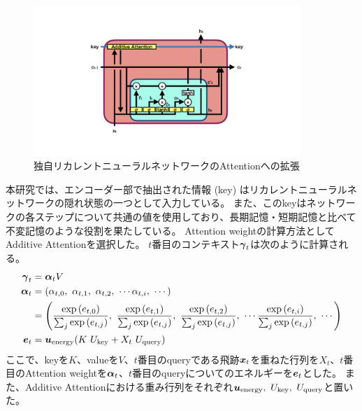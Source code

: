 \begin{figure}[htbp]
 \centering
 \includegraphics[trim = 100 100 100 150, width=0.9\textwidth, clip]{Figure/3Networks/3-4-1-5AttentionVLSTM.png}
 \caption{独自リカレントニューラルネットワークのAttentionへの拡張}
 \label{3-4-1-5AttentionVLSTM}
\end{figure}

本研究では、エンコーダー部で抽出された情報 (key) はリカレントニューラルネットワークの隠れ状態の一つとして入力している。
また、このkeyはネットワークの各ステップについて共通の値を使用しており、長期記憶・短期記憶と比べて不変記憶のような役割を果たしている。
Attention weightの計算方法としてAdditive Attentionを選択した。
$t$番目のコンテキスト${\mbox{\boldmath{$\gamma$}}}_{t}$は次のように計算される。
\begin{equation}
 \begin{split}
  {\mbox{\boldmath{$\gamma$}}}_{t} 
  &= {\mbox{\boldmath{$\alpha$}}}_{t} V\\
  {\mbox{\boldmath{$\alpha$}}}_{t}
  &= (\alpha_{t,0},\ \alpha_{t,1},\ \alpha_{t,2},\ \cdots \alpha_{t,i},\ \cdots) \\
  &= \left(\frac{\exp{({{e}}_{t,0})}}{\sum_j \exp{({{e}}_{t,j})}},\ \frac{\exp{({{e}}_{t,1})}}{\sum_j \exp{({{e}}_{t,j})}},\ \frac{\exp{({{e}}_{t,2})}}{\sum_j \exp{({{e}}_{t,j})}},\  \cdots \frac{\exp{({{e}}_{t,i})}}{\sum_j \exp{({{e}}_{t,j})}},\ \cdots\right)\\
  {\mbox{\boldmath{$e$}}}_{t}
  &={\mbox{\boldmath{$u$}}}_{\rm energy} (K\ U_{\rm key} + X_t\ U_{\rm query}) \\
 \end{split}
\end{equation}
ここで、keyを$K$、valueを$V$、$t$番目のqueryである飛跡${\mbox{\boldmath{$x$}}}_{t}$を重ねた行列を$X_t$、$t$番目のAttention weightを${\mbox{\boldmath{$\alpha$}}}_{t}$、$t$番目のqueryについてのエネルギーを${\mbox{\boldmath{$e$}}}_{t}$とした。
また、Additive Attentionにおける重み行列をそれぞれ${\mbox{\boldmath{$u$}}}_{\rm energy},\  U_{\rm key},\ U_{\rm query}$と置いた。

